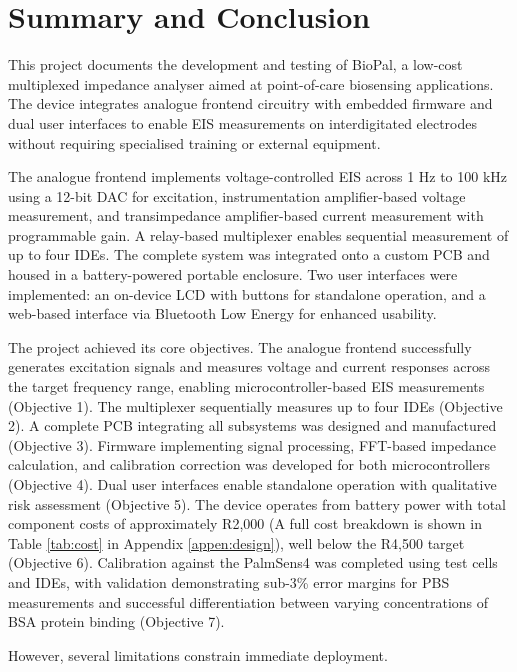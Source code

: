 \graphicspath{{conclusion/fig/}}

\chapter{Summary and Conclusion}
\label{chap:conclusion}
This project documents the development and testing of BioPal, a low-cost multiplexed impedance analyser aimed at point-of-care biosensing applications. The device integrates analogue frontend circuitry with embedded firmware and dual user interfaces to enable \ac{EIS} measurements on interdigitated electrodes without requiring specialised training or external equipment.

The analogue frontend implements voltage-controlled EIS across 1 Hz to 100 kHz using a 12-bit DAC for excitation, instrumentation amplifier-based voltage measurement, and transimpedance amplifier-based current measurement with programmable gain. A relay-based multiplexer enables sequential measurement of up to four \acp{IDE}. The complete system was integrated onto a custom PCB and housed in a battery-powered portable enclosure. Two user interfaces were implemented: an on-device LCD with buttons for standalone operation, and a web-based interface via Bluetooth Low Energy for enhanced usability.

The project achieved its core objectives. The analogue frontend successfully generates excitation signals and measures voltage and current responses across the target frequency range, enabling microcontroller-based EIS measurements (Objective 1). The multiplexer sequentially measures up to four IDEs (Objective 2). A complete PCB integrating all subsystems was designed and manufactured (Objective 3). Firmware implementing signal processing, FFT-based impedance calculation, and calibration correction was developed for both microcontrollers (Objective 4). Dual user interfaces enable standalone operation with qualitative risk assessment (Objective 5). The device operates from battery power with total component costs of approximately R2,000 (A full cost breakdown is shown in Table \ref{tab:cost} in Appendix \ref{appen:design}), well below the R4,500 target (Objective 6). Calibration against the PalmSens4 was completed using test cells and IDEs, with validation demonstrating sub-3\% error margins for PBS measurements and successful differentiation between varying concentrations of BSA protein binding (Objective 7).

However, several limitations constrain immediate deployment. 
